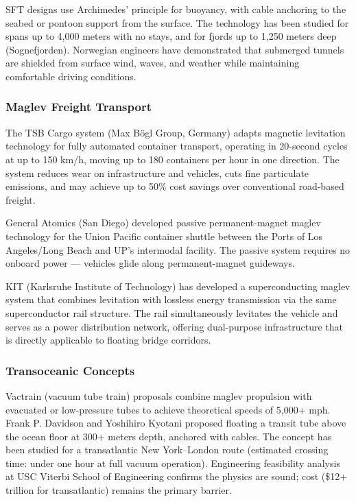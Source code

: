 \documentclass[11pt,letterpaper]{article}
\begin{document}
SFT designs use Archimedes' principle for buoyancy, with cable anchoring to the seabed or pontoon support from the surface. The technology has been studied for spans up to 4,000 meters with no stays, and for fjords up to 1,250 meters deep (Sognefjorden). Norwegian engineers have demonstrated that submerged tunnels are shielded from surface wind, waves, and weather while maintaining comfortable driving conditions.

\subsubsection{Maglev Freight Transport}

The TSB Cargo system (Max Bögl Group, Germany) adapts magnetic levitation technology for fully automated container transport, operating in 20-second cycles at up to 150 km/h, moving up to 180 containers per hour in one direction. The system reduces wear on infrastructure and vehicles, cuts fine particulate emissions, and may achieve up to 50\% cost savings over conventional road-based freight.

General Atomics (San Diego) developed passive permanent-magnet maglev technology for the Union Pacific container shuttle between the Ports of Los Angeles/Long Beach and UP's intermodal facility. The passive system requires no onboard power --- vehicles glide along permanent-magnet guideways.

KIT (Karlsruhe Institute of Technology) has developed a superconducting maglev system that combines levitation with lossless energy transmission via the same superconductor rail structure. The rail simultaneously levitates the vehicle and serves as a power distribution network, offering dual-purpose infrastructure that is directly applicable to floating bridge corridors.

\subsubsection{Transoceanic Concepts}

Vactrain (vacuum tube train) proposals combine maglev propulsion with evacuated or low-pressure tubes to achieve theoretical speeds of 5,000+ mph. Frank P. Davidson and Yoshihiro Kyotani proposed floating a transit tube above the ocean floor at 300+ meters depth, anchored with cables. The concept has been studied for a transatlantic New York--London route (estimated crossing time: under one hour at full vacuum operation). Engineering feasibility analysis at USC Viterbi School of Engineering confirms the physics are sound; cost (\$12+ trillion for transatlantic) remains the primary barrier.
\end{document}
